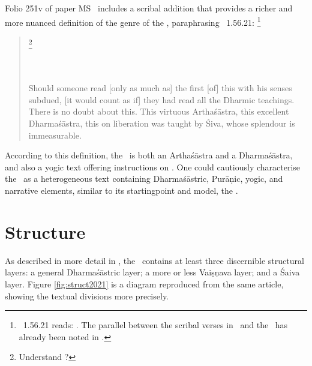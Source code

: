 Folio 251v of paper MS \msPaperA\ includes a scribal addition 
that provides a richer and more nuanced definition of the genre of the \VSS, 
paraphrasing \MBh\ 1.56.21:%
        \footnote{\MBh\ 1.56.21 reads:
                 . 
                      The parallel between the scribal verses in \msPaperA\ and the 
                      \MBH\ has already been noted in 
                      .}

\begin{quote}
% 
		\footnote{Understand ?}
							\\
\\
\\

Should someone read [only as much as] the first  [of]
this  with his senses subdued, [it would count as if]
they had read all the Dharmic teachings. There is no doubt about this.
This virtuous Arthaśāstra, this excellent Dharmaśāstra, 
this  on liberation was taught by Śiva, whose splendour is
immeasurable.
\end{quote}

\noindent
According to this definition, the \VSS\ is both an Arthaśāstra and a
Dharmaśāstra, and also a yogic text offering instructions on .
One could cautiously characterise the \VSS\ as a heterogeneous
text containing Dharmaśāstric, Purāṇic, yogic, and narrative elements,
similar to its starting\linebreak point and model, the \MBh.




\section{Structure}\label{structure}

As described in more detail in ,
the \VSS\ contains at least three discernible structural layers:
a general Dharmaśāstric layer; a more or less Vaiṣṇa\-va layer;
and a Śaiva layer. Figure \ref{fig:struct2021} is
a diagram reproduced from the same article,
showing the textual divisions more precisely.

